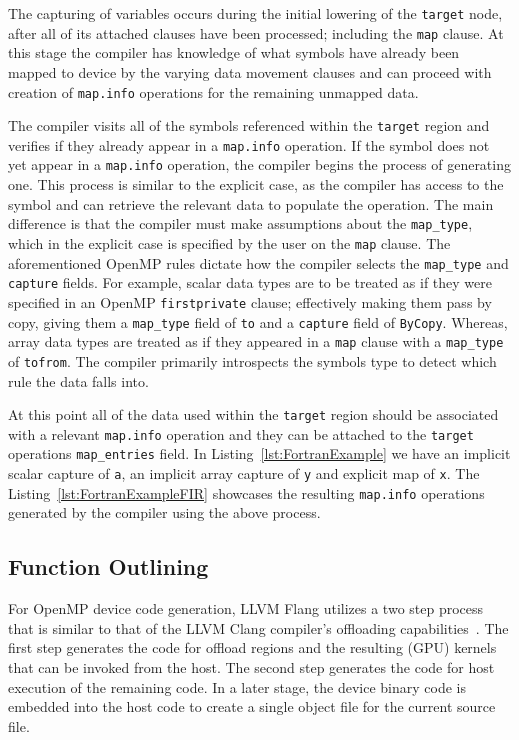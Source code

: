 \documentclass[acmtog,natbib=false]{acmart}
\newcommand{\code}[1]{\texttt{#1}\xspace}
\begin{document}
The capturing of variables occurs during the initial lowering of the \code{target} node, after all of its attached clauses have been processed; including the \code{map} clause. 
At this stage the compiler has knowledge of what symbols have already been mapped to device by the varying data movement clauses and can proceed with creation of \code{map.info} operations for the remaining unmapped data.

The compiler visits all of the symbols referenced within the \code{target} region and verifies if they already appear in a \code{map.info} operation. 
If the symbol does not yet appear in a \code{map.info} operation, the compiler begins the process of generating one. 
This process is similar to the explicit case, as the compiler has access to the symbol and can retrieve the relevant data to populate the operation. 
The main difference is that the compiler must make assumptions about the \code{map\_type}, which in the explicit case is specified by the user on the \code{map} clause. 
The aforementioned OpenMP rules dictate how the compiler selects the \code{map\_type} and \code{capture} fields. 
For example, scalar data types are to be treated as if they were specified in an OpenMP \code{firstprivate} clause; effectively making them pass by copy, giving them a \code{map\_type} field of \code{to} and a \code{capture} field of \code{ByCopy}. 
Whereas, array data types are treated as if they appeared in a \code{map} clause with a \code{map\_type} of \code{tofrom}. 
The compiler primarily introspects the symbols type to detect which rule the data falls into.

At this point all of the data used within the \code{target} region should be associated with a relevant \code{map.info} operation and they can be attached to the \code{target} operations \code{map\_entries} field. 
In Listing~\ref{lst:FortranExample} we have an implicit scalar capture of \code{a}, an implicit array capture of \code{y} and explicit map of \code{x}. 
The Listing~\ref{lst:FortranExampleFIR} showcases the resulting \code{map.info} operations generated by the compiler using the above process.

\subsection{Function Outlining}
\label{sec:FunctionOutlining}

For OpenMP device code generation, LLVM Flang utilizes a two step process that is similar to that of the LLVM Clang compiler's offloading capabilities~\cite{antao2016offloading}. 
The first step generates the code for offload regions and the resulting (GPU) kernels that can be invoked from the host.
The second step generates the code for host execution of the remaining code.
In a later stage, the device binary code is embedded into the host code to create a single object file for the current source file.
 
\end{document}
